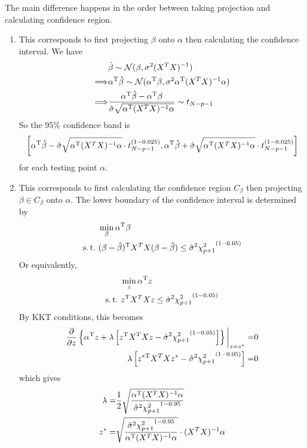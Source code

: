 \begin{sol}
The main difference happens in the order between taking projection and calculating confidence region.
\begin{enumerate}
\item This corresponds to first projecting $\beta$ onto $\alpha$ then calculating the confidence interval. We have
\begin{align*}
&\hat{\beta}\sim\mathcal{N}(\beta, \sigma^2(X^TX)^{-1})\\
\Longrightarrow & \alpha^{\mathrm{T}}\hat{\beta}\sim\mathcal{N}(\alpha^{\mathrm{T}}\beta, \sigma^2\alpha^{\mathrm{T}}(X^TX)^{-1}\alpha)\\
\Longrightarrow & \frac{\alpha^{\mathrm{T}}\hat{\beta} - \alpha^{\mathrm{T}}\beta}{\hat{\sigma}\sqrt{\alpha^{\mathrm{T}}(X^TX)^{-1}\alpha}} \sim t_{N-p-1}
\end{align*}
So the 95\% confidence band is
\[
\left[\alpha^{\mathrm{T}}\hat{\beta}-\hat{\sigma}\sqrt{\alpha^{\mathrm{T}}(X^TX)^{-1}\alpha}\cdot t_{N-p-1}^{(1-0.025)}, \alpha^{\mathrm{T}}\hat{\beta}+\hat{\sigma}\sqrt{\alpha^{\mathrm{T}}(X^TX)^{-1}\alpha}\cdot t_{N-p-1}^{(1-0.025)}\right]
\]
for each testing point $\alpha$.
\item This corresponds to first calculating the confidence region $C_\beta$ then projecting $\beta\in C_\beta$ onto $\alpha$. The lower boundary of the confidence interval is determined by
\begin{align*}
&\min_\beta \Tr{\alpha}\beta\\
\st& \Tr{(\beta-\hat{\beta})}X^TX(\beta-\hat{\beta})\le\hat{\sigma}^2{\chi_{p+1}^2}^{(1-0.05)}
\end{align*}
Or equivalently,
\begin{align*}
&\min_z \Tr{\alpha}z\\
\st& \Tr{z}X^TXz\le\hat{\sigma}^2{\chi_{p+1}^2}^{(1-0.05)}
\end{align*}
By KKT conditions, this becomes
\begin{align*}
\frac{\partial}{\partial z}\left\{\alpha^{\mathrm{T}}z + \lambda\left[z^{\mathrm{T}}X^TXz-\hat{\sigma}^2{\chi_{p+1}^2}^{(1-0.05)}\right]\right\}\bigg|_{z=z^*}=& 0\\
\lambda\left[z^{*\mathrm{T}}X^TXz^*-\hat{\sigma}^2{\chi_{p+1}^2}^{(1-0.05)}\right] =& 0
\end{align*}
which gives
\begin{align*}
\lambda=&\frac{1}{2}\sqrt{\frac{\Tr{\alpha}(X^TX)^{-1}\alpha}{\hat{\sigma}^2{\chi_{p+1}^2}^{1-0.95}}}\\
z^*=&\sqrt{\frac{\hat{\sigma}^2{\chi_{p+1}^2}^{1-0.95}}{\Tr{\alpha}(X^TX)^{-1}\alpha}}\cdot(X^TX)^{-1}\alpha

\end{align*}
\end{enumerate}
\end{sol}
